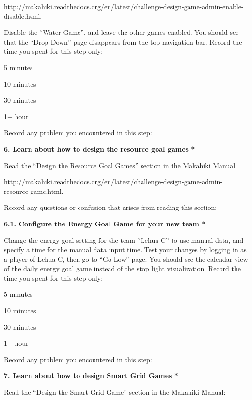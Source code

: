 http://makahiki.readthedocs.org/en/latest/challenge-design-game-admin-enable-disable.html. 

Disable the ``Water Game'', and leave the other games enabled. You should see that the ``Drop Down'' page disappears from the top navigation bar. Record the time you spent for this step only:

\begin{radiobutton}
\item 5 minutes
\item  10 minutes
\item  30 minutes
\item  1+ hour
\end{radiobutton}


Record any problem you encountered in this step: \underline{\hspace{4cm}}

{\bf 6. Learn about how to design the resource goal games *}

Read the ``Design the Resource Goal Games'' section in the Makahiki Manual:

http://makahiki.readthedocs.org/en/latest/challenge-design-game-admin-resource-game.html. 

Record any questions or confusion that arises from reading this section: \underline{\hspace{4cm}}

{\bf 6.1. Configure the Energy Goal Game for your new team *}

Change the energy goal setting for the team ``Lehua-C'' to use manual data, and specify a time for the manual data input time. Test your changes by logging in as a player of Lehua-C, then go to ``Go Low'' page. You should see the calendar view of the daily energy goal game instead of the stop light visualization. Record the time you spent for this step only:

\begin{radiobutton}
\item 5 minutes
\item  10 minutes
\item  30 minutes
\item  1+ hour
\end{radiobutton}

Record any problem you encountered in this step: \underline{\hspace{4cm}}

{\bf 7. Learn about how to design Smart Grid Games *}

Read the ``Design the Smart Grid Game'' section in the Makahiki Manual:

